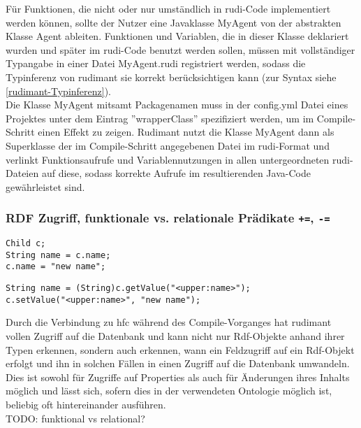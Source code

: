Für Funktionen, die nicht oder nur umständlich in rudi-Code implementiert werden können, sollte der Nutzer eine Javaklasse MyAgent von der abstrakten Klasse Agent ableiten. Funktionen und Variablen, die in dieser Klasse deklariert wurden und später im rudi-Code benutzt werden sollen, müssen mit vollständiger Typangabe in einer Datei MyAgent.rudi registriert werden, sodass die Typinferenz von rudimant sie korrekt berücksichtigen kann (zur Syntax siehe \ref{rudimant-Typinferenz}).\\
Die Klasse MyAgent mitsamt Packagenamen muss in der config.yml Datei eines Projektes unter dem Eintrag ''wrapperClass'' spezifiziert werden, um im Compile-Schritt einen Effekt zu zeigen. Rudimant nutzt die Klasse MyAgent dann als Superklasse der im Compile-Schritt angegebenen Datei im rudi-Format und verlinkt Funktionsaufrufe und Variablennutzungen in allen untergeordneten rudi-Dateien auf diese, sodass korrekte Aufrufe im resultierenden Java-Code gewährleistet sind.

\subsubsection{RDF Zugriff, funktionale vs. relationale Prädikate
  \texttt{+=}, \texttt{-=}}

\begin{minipage}{0.4\textwidth}
\begin{verbatim}
Child c;
String name = c.name;
c.name = "new name";
\end{verbatim}
\end{minipage}
\begin{minipage}{0.6\textwidth}
\begin{verbatim}
String name = (String)c.getValue("<upper:name>");
c.setValue("<upper:name>", "new name");
\end{verbatim}
\end{minipage}

Durch die Verbindung zu hfc während des Compile-Vorganges hat rudimant vollen Zugriff auf die Datenbank und kann nicht nur Rdf-Objekte anhand ihrer Typen erkennen, sondern auch erkennen, wann ein Feldzugriff auf ein Rdf-Objekt erfolgt und ihn in solchen Fällen in einen Zugriff auf die Datenbank umwandeln. Dies ist sowohl für Zugriffe auf Properties als auch für Änderungen ihres Inhalts möglich und lässt sich, sofern dies in der verwendeten Ontologie möglich ist, beliebig oft hintereinander ausführen.\\

TODO: funktional vs relational?
  

